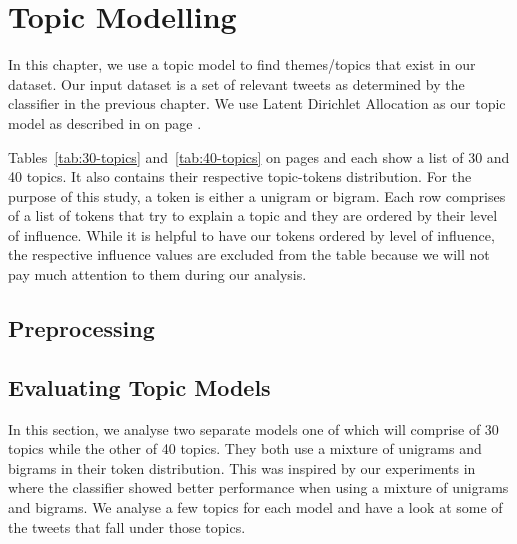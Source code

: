 \chapter{Topic Modelling}
\label{cha:topic-modelling}
In this chapter, we use a topic model to find themes/topics that exist in our dataset. Our input
dataset is a set of relevant tweets as determined by the classifier in the previous chapter. We use
Latent Dirichlet Allocation as our topic model as described in  on page
\pageref{sec:bg-lda}.

Tables~\ref{tab:30-topics} and~\ref{tab:40-topics} on pages \pageref{tab:30-topics} and
\pageref{tab:40-topics} each show a list of 30 and 40 topics. It also contains their respective
topic-tokens distribution. For the purpose of this study, a token is either a unigram or bigram.
Each row comprises of a list of tokens that try to explain a topic and they are ordered by their
level of influence. While it is helpful to have our tokens ordered by level of influence, the
respective influence values are excluded from the table because we will not pay much
attention to them during our analysis.


\section{Preprocessing}
\label{sec:lda-preprocessing}

\section{Evaluating Topic Models}
\label{sec:evaluating-topic-models}
In this section, we analyse two separate models one of which will comprise of 30 topics while the
other of 40 topics. They both use a mixture of unigrams and bigrams in their token distribution.
This was inspired by our experiments in  where the classifier
showed better performance when using a mixture of unigrams and bigrams. We analyse a few topics for
each model and have a look at some of the tweets that fall under those topics.

